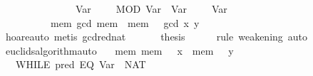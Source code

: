 \begin{isabellebody}
\ \ \ \ \ \ \ \ \ \ \ \ {}\ {}\ {}{}\ Var\ {}\ {}\ {}\ {}{}\ MOD\ {}Var\ {}{}\ {}Var\ {}{}\ {}\ {}\ {}{}\ Var\ {}\ {}\isanewline
\ \ \ \ \ \ \ \ \ \ {}mem{}\ gcd\ {}mem\ {}{}\ {}mem\ {}{}\ {}\ gcd\ x\ y{}{}\isanewline
\ \ \ \ \ \ \isamarkupfalse%
\ {}hoare{}auto{}\ metis\ gcd{}red{}nat{}\isanewline
\ \ \isamarkupfalse%
\isanewline
\ \ \isamarkupfalse%
\ {}thesis\isanewline
\ \ \ \ \isamarkupfalse%
\ {}rule\ weakening{}\ auto{}\isanewline
{}\isamarkupfalse%
%
\endisatagproof
{\isafoldproof}%
%
\isadelimproof
\isanewline
%
\endisadelimproof
\isanewline
{}\isamarkupfalse%
\ euclids{}algorithm{}auto{}\isanewline
\ \ \ {}{}mem{}\ mem\ {}\ {}\ x\ {}\ mem\ {}\ {}\ y{}\ {}\isanewline
\ \ \ WHILE\ {}{}pred\ {}EQ\ {}Var\ {}{}\ {}NAT\ {}{}{}{}\isanewline

\end{isabellebody}
